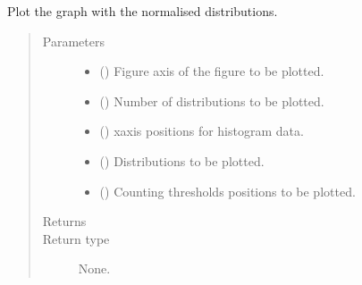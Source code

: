 \documentclass[letterpaper,10pt,english]{sphinxmanual}
\begin{document}
\begin{fulllineitems}
\label{\detokenize{tes:tes.calibration.plot_normalised}}
\sphinxAtStartPar
Plot the graph with the normalised distributions.
\begin{quote}\begin{description}
\item[{Parameters}] \leavevmode\begin{itemize}
\item {} 
\sphinxAtStartPar
{} () \textendash{} Figure axis of the figure to be plotted.

\item {} 
\sphinxAtStartPar
{} () \textendash{} Number of distributions to be plotted.

\item {} 
\sphinxAtStartPar
{} () \textendash{} x\sphinxhyphen{}axis positions for histogram data.

\item {} 
\sphinxAtStartPar
{} () \textendash{} Distributions to be plotted.

\item {} 
\sphinxAtStartPar
{} () \textendash{} Counting thresholds positions to be plotted.

\end{itemize}

\item[{Returns}] \leavevmode
\sphinxAtStartPar


\item[{Return type}] \leavevmode
\sphinxAtStartPar
None.

\end{description}\end{quote}

\end{fulllineitems}
\end{document}
